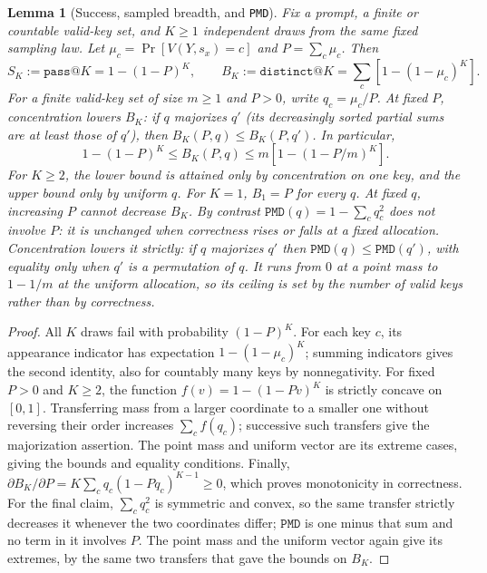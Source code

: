 \documentclass{article}
\newcommand{\1}{\mathbf 1}
\newcommand{\pmd}{\texttt{PMD}}
\newtheorem{lemma}{Lemma}[section]
\theoremstyle{remark}
\theoremstyle{definition}
\theoremstyle{plain}
\begin{document}
\begin{lemma}[Success, sampled breadth, and \pmd{}]
\label{lem:success-breadth}
Fix a prompt, a finite or countable valid-key set, and $K\ge1$ independent
draws from the same fixed sampling law. Let
$\mu_c=\Pr[V(Y,s_x)=c]$ and $P=\sum_c\mu_c$. Then
\begin{equation}
 S_K:=\texttt{pass@}K=1-(1-P)^K,\qquad
 B_K:=\texttt{distinct@}K=\sum_c[1-(1-\mu_c)^K].
 \label{eq:success-breadth-identities}
\end{equation}
For a finite valid-key set of size $m\ge1$ and $P>0$, write $q_c=\mu_c/P$.
At fixed $P$, concentration lowers $B_K$: if $q$ majorizes $q'$
(its decreasingly sorted partial sums are at least those of $q'$), then
$B_K(P,q)\le B_K(P,q')$. In particular,
\begin{equation}
 1-(1-P)^K\le B_K(P,q)\le m[1-(1-P/m)^K].
 \label{eq:fixed-success-breadth-bounds}
\end{equation}
For $K\ge2$, the lower bound is attained only by concentration on one key,
and the upper bound only by uniform $q$. For $K=1$, $B_1=P$ for every $q$.
At fixed $q$, increasing $P$ cannot decrease $B_K$.
By contrast $\pmd(q)=1-\sum_c q_c^2$ does not involve $P$: it is unchanged when
correctness rises or falls at a fixed allocation. Concentration lowers it
strictly: if $q$ majorizes $q'$ then $\pmd(q)\le\pmd(q')$, with equality only
when $q'$ is a permutation of $q$. It runs from $0$ at a point mass to
$1-1/m$ at the uniform allocation, so its ceiling is set by the number of
valid keys rather than by correctness.
\end{lemma}
\begin{proof}
All $K$ draws fail with probability $(1-P)^K$. For each key $c$, its
appearance indicator has expectation $1-(1-\mu_c)^K$; summing indicators
gives the second identity, also for countably many keys by nonnegativity.
For fixed $P>0$ and $K\ge2$, the function
$f(v)=1-(1-Pv)^K$ is strictly concave on $[0,1]$.
Transferring mass from a larger coordinate to a smaller one without reversing
their order increases $\sum_c f(q_c)$; successive such transfers give the
majorization assertion. The point mass and uniform vector are its extreme
cases, giving the bounds and equality conditions. Finally,
$\partial B_K/\partial P=K\sum_c q_c(1-Pq_c)^{K-1}\ge0$,
which proves monotonicity in correctness.
For the final claim, $\sum_c q_c^2$ is symmetric and convex, so the
same transfer strictly decreases it whenever the two coordinates differ;
$\pmd$ is one minus that sum and no term in it involves $P$. The point mass and
the uniform vector again give its extremes, by the same two transfers that gave
the bounds on $B_K$.
\end{proof}
\end{document}
